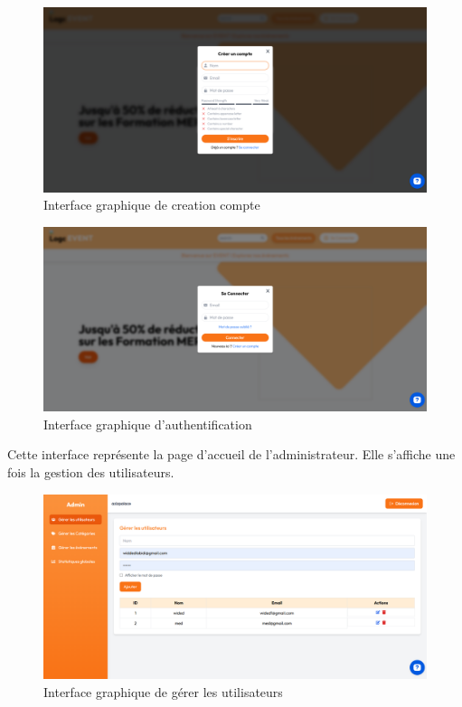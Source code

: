 \begin{figure}[H]
    \centering
    \includegraphics[width=1\linewidth]{projet/images/diagramme de sequance/images/registration.png}
    \caption{Interface graphique de creation compte}
    \label{fig:interface1}
\end{figure}

\begin{figure}[H]
    \centering
    \includegraphics[width=1\linewidth]{projet/images/diagramme de sequance/images/login.png}
    \caption{Interface graphique d'authentification}
    \label{fig:interface2}
\end{figure}

Cette interface représente la page d'accueil de l'administrateur. Elle s'affiche une fois la gestion des utilisateurs.

\begin{figure}[H]
    \centering
    \includegraphics[width=1\linewidth]{projet/images/diagramme de sequance/images/gestion d'utilisateur.png}
    \caption{Interface graphique de gérer les utilisateurs}
    \label{fig:interface3}
\end{figure}